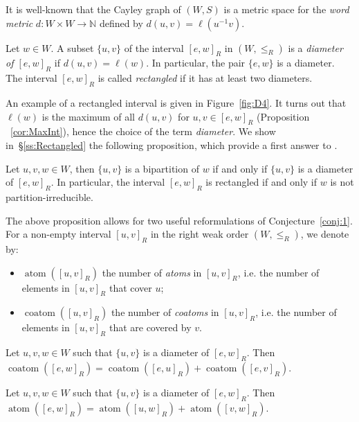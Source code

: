 \documentclass[Unicode]{cedram-alco}
\theoremstyle{definition}
\newcommand{\coatom}{\operatorname{coatom}}
\newcommand{\atom}{\operatorname{atom}}
\begin{document}
It is well-known that the Cayley graph of $(W,S)$ is a metric space for the {\em word metric} $d:W\times W\to \mathbb N$ defined by  $d(u,v)=\ell(u^{-1}v)$. 

\begin{defi}\label{def:2} Let $w\in W$. A subset $\{u,v\}$ of the interval  $[e,w]_R$ in $(W,\leq_R)$ is a {\em diameter of  $[e,w]_R$} if $d(u,v)=\ell(w)$. In particular, the pair $\{e,w\}$ is a diameter. The interval $[e,w]_R$ is called {\em rectangled} if it has at least two diameters. 
\end{defi}

An example of a rectangled interval is given in Figure~\ref{fig:D4}. It turns out that $\ell(w)$ is the maximum of all $d(u,v)$ for $u,v\in [e,w]_R$ (Proposition ~\ref{cor:MaxInt}),  hence the choice of the term {\em diameter}. We show in~\S\ref{ss:Rectangled} the following proposition, which provide a first answer to  \cite[Question~6]{DiRo09}.

\begin{prop}\label{prop:rectangled} Let  $u,v,w\in W$, then $\{u,v\}$ is a bipartition of $w$ if and only if $\{u,v\}$ is a diameter of $[e,w]_R$. In particular, the interval $[e,w]_R$ is rectangled if and only if $w$ is not partition-irreducible.
\end{prop}

The above proposition allows for two useful reformulations of Conjecture~\ref{conj:1}.  For a non-empty interval $[u,v]_R$ in the right weak order $(W,\leq_R)$, we denote by:
\begin{itemize}
\item $\atom([u,v]_R)$ the number of  {\em atoms} in $[u,v]_R$, i.e. the number of elements in $[u,v]_R$ that cover  $u$; 
\item $\coatom([u,v]_R)$ the number of  {\em coatoms} in $[u,v]_R$, i.e. the number of elements in $[u,v]_R$ that are covered by $v$.
\end{itemize}



\begin{conj}\label{conj:2} Let $u,v,w\in W$ such that $\{u,v\}$ is a diameter of $[e,w]_R$. Then $\coatom([e,w]_R)= \coatom([e,u]_R) + \coatom([e,v]_R)$.
\end{conj} 

\begin{conj}\label{conj:3} Let $u,v,w\in W$ such that $\{u,v\}$ is a diameter of $[e,w]_R$. Then $\atom([e,w]_R)= \atom([u,w]_R) + \atom([v,w]_R)$.
\end{conj} 
\end{document}
